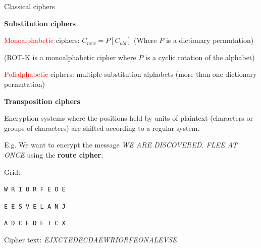 \begin{frame}{Classical ciphers}

\textbf{Substitution ciphers}

\textcolor{red}{Monoalphabetic} ciphers: $C_{new} = P[C_{old}]$ (Where $P$ is a dictionary permutation)

\smallskip

(ROT-K is a monoalphabetic cipher where $P$ is a cyclic rotation of the alphabet)

\smallskip

\textcolor{red}{Polialphabetic} ciphers: multiple substitution alphabets (more than one dictionary permutation)

\smallskip

\textbf{Transposition ciphers}

Encryption systems where the positions held by units of plaintext (characters or groups of characters) are shifted according to a regular system.

\smallskip

E.g. We want to encrypt the message \textit{WE ARE DISCOVERED. FLEE AT ONCE} using the \textbf{route cipher}:

Grid: 

\centerline{\texttt{W R I O R F E O E}}
\centerline{\texttt{E E S V E L A N J}}
\centerline{\texttt{A D C E D E T C X}}

Cipher text: \textit{EJXCTEDECDAEWRIORFEONALEVSE}


\end{frame}

